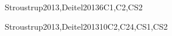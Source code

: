 \begin{syllabus}
\begin{unit}{\SDFFundamentalProgrammingConcepts}{}{Stroustrup2013,Deitel2013}{6}{C1,C2,CS2}
    \begin{topics}
        \item \SDFFundamentalProgrammingConceptsTopicBasic
        \item \SDFFundamentalProgrammingConceptsTopicVariables
        \item \SDFFundamentalProgrammingConceptsTopicExpressions
        \item \SDFFundamentalProgrammingConceptsTopicSimple
        \item \SDFFundamentalProgrammingConceptsTopicConditional
        \item \SDFFundamentalProgrammingConceptsTopicFunctions
    \end{topics}
    \begin{learningoutcomes}
        \item \SDFFundamentalProgrammingConceptsLOAnalyzeAndBehavior [\Assessment]
        \item \SDFFundamentalProgrammingConceptsLOIdentifyAndOf [\Familiarity]
        \item \SDFFundamentalProgrammingConceptsLOWritePrograms [\Usage]
        \item \SDFFundamentalProgrammingConceptsLOModify [\Usage]
        \item \SDFFundamentalProgrammingConceptsLODesignImplement [\Usage]
        \item \SDFFundamentalProgrammingConceptsLOWriteAUses [\Usage]
        \item \SDFFundamentalProgrammingConceptsLOChooseAppropriateIteration [\Assessment]
        \item \SDFFundamentalProgrammingConceptsLODescribeTheRecursion [\Familiarity]
        \item \SDFFundamentalProgrammingConceptsLOIdentifyTheAndCase [\Assessment]
    \end{learningoutcomes}
\end{unit}

\begin{unit}{\PLObjectOrientedProgramming}{}{Stroustrup2013,Deitel2013}{10}{C2,C24,CS1,CS2}
    \begin{topics}
        \item \PLObjectOrientedProgrammingTopicObject
        \item \PLObjectOrientedProgrammingTopicObjectOriented
        \item \PLObjectOrientedProgrammingTopicDefinition
        \item \PLObjectOrientedProgrammingTopicSubclasses
        \item \PLObjectOrientedProgrammingTopicSubtyping
        \item \PLObjectOrientedProgrammingTopicUsing
        \item \PLObjectOrientedProgrammingTopicDynamic


\end{topics}
\end{unit}
\end{syllabus}
